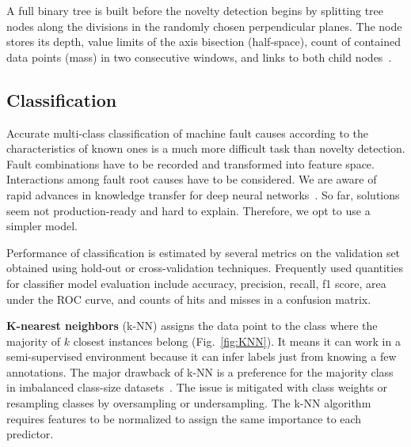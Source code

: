 A full binary tree is built before the novelty detection begins by splitting tree nodes along the divisions in the randomly chosen perpendicular planes. The node stores its depth, value limits of the axis bisection (half-space), count of contained data points (mass) in two consecutive windows, and links to both child nodes~\cite{tan_fast_2011}. 

\subsection{Classification}
Accurate multi-class classification of machine fault causes according to the characteristics of known ones is a much more difficult task than novelty detection. Fault combinations have to be recorded and transformed into feature space. Interactions among fault root causes have to be considered. We are aware of rapid advances in knowledge transfer for deep neural networks~\cite{maurya_condition-based_2021}. So far, solutions seem not production-ready and hard to explain. Therefore, we opt to use a simpler model.

Performance of classification is estimated by several metrics on the validation set obtained using hold-out or cross-validation techniques. Frequently used quantities for classifier model evaluation include accuracy, precision, recall, f1 score, area under the ROC curve, and counts of hits and misses in a confusion matrix.
\bigbreak

\textbf{K-nearest neighbors} (k-NN) assigns the data point to the class where the majority of $k$ closest instances belong (Fig.~\ref{fig:KNN}). It means it can work in a semi-supervised environment because it can infer labels just from knowing a few annotations. The major drawback of k-NN is a preference for the majority class in imbalanced class-size datasets~\cite{shi_improving_2020}. The issue is mitigated with class weights or resampling classes by oversampling or undersampling. The k-NN algorithm requires features to be normalized to assign the same importance to each predictor.

